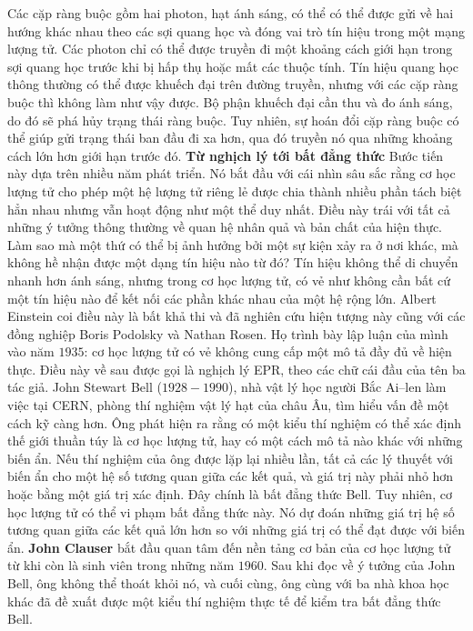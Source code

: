 \begin{multicols}{2}
\begin{figure}[H]
		\vspace*{-10pt}
	\end{figure}
	Các cặp ràng buộc gồm hai photon, hạt ánh sáng, có thể có thể được gửi về hai hướng khác nhau theo các sợi quang học và đóng vai trò tín hiệu trong một mạng lượng tử. Các photon chỉ có thể được truyền đi một khoảng cách giới hạn trong sợi quang học trước khi bị hấp thụ hoặc mất các thuộc tính. Tín hiệu quang học thông thường có thể được khuếch đại trên đường truyền, nhưng với các cặp ràng buộc thì không làm như vậy được. Bộ phận khuếch đại cần thu và đo ánh sáng, do đó sẽ phá hủy trạng thái ràng buộc. Tuy nhiên, sự hoán đổi cặp ràng buộc có thể giúp gửi trạng thái ban đầu đi xa hơn, qua đó truyền nó qua những khoảng cách lớn hơn giới hạn trước đó.
	\vskip 0.1cm
	\textbf{\color{timhieukhoahoc}Từ nghịch lý tới bất đẳng thức}
	\vskip 0.1cm
	Bước tiến này dựa trên nhiều năm phát triển. Nó bắt đầu với cái nhìn sâu sắc rằng cơ học lượng tử cho phép một hệ lượng tử riêng lẻ được chia thành nhiều phần tách biệt hẳn nhau nhưng vẫn hoạt động như một thể duy nhất.
	\vskip 0.1cm
	Điều này trái với tất cả những ý tưởng thông thường về quan hệ nhân quả và bản chất của hiện thực. Làm sao mà một thứ có thể bị ảnh hưởng bởi một sự kiện xảy ra ở nơi khác, mà không hề nhận được một dạng tín hiệu nào từ đó? Tín hiệu không thể di chuyển nhanh hơn ánh sáng, nhưng trong cơ học lượng tử, có vẻ như không cần bất cứ một tín hiệu nào để kết nối các phần khác nhau của một hệ rộng lớn.
	\vskip 0.1cm
	Albert Einstein coi điều này là bất khả thi và đã nghiên cứu hiện tượng này cũng với các đồng nghiệp Boris Podolsky và Nathan Rosen. Họ trình bày lập luận của mình vào năm $1935$: cơ học lượng tử có vẻ không cung cấp một mô tả đầy đủ về hiện thực. Điều này về sau được gọi là nghịch lý EPR, theo các chữ cái đầu của tên ba tác giả.
	\vskip 0.1cm
	John Stewart Bell ($1928 - 1990$), nhà vật lý học người Bắc Ai--len làm việc tại CERN, phòng thí nghiệm vật lý hạt của châu Âu, tìm hiểu vấn đề một cách kỹ càng hơn. Ông phát hiện ra rằng có một kiểu thí nghiệm có thể xác định thế giới thuần túy là cơ học lượng tử, hay có một cách mô tả nào khác với những biến ẩn. Nếu thí nghiệm của ông được lặp lại nhiều lần, tất cả các lý thuyết với biến ẩn cho một hệ số tương quan giữa các kết quả, và giá trị này phải nhỏ hơn hoặc bằng một giá trị xác định. Đây chính là bất đẳng thức Bell.
	\vskip 0.1cm
	Tuy nhiên, cơ học lượng tử có thể vi phạm bất đẳng thức này. Nó dự đoán những giá trị hệ số tương quan giữa các kết quả lớn hơn so với những giá trị có thể đạt được với biến ẩn.
	\vskip 0.1cm
	\textbf{\color{timhieukhoahoc}John Clauser} bắt đầu quan tâm đến nền tảng cơ bản của cơ học lượng tử từ khi còn là sinh viên trong những năm $1960$. Sau khi đọc về ý tưởng của John Bell, ông không thể thoát khỏi nó, và cuối cùng, ông cùng với ba nhà khoa học khác đã đề xuất được một kiểu thí nghiệm thực tế để kiểm tra bất đẳng thức Bell.

\end{multicols}
